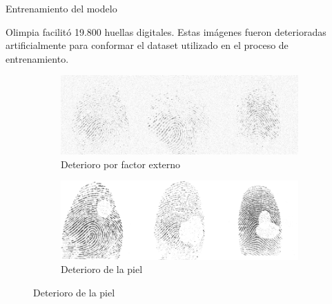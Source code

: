 \documentclass[12pt,aspectratio=169]{beamer}
\begin{document}
\begin{frame}{Entrenamiento del modelo}

    Olimpia facilitó 19.800 huellas digitales. Estas imágenes fueron deterioradas artificialmente para conformar el dataset utilizado en el proceso de entrenamiento.
    \vspace{5mm}

    \begin{figure}
        \begin{subfigure}{0.48\textwidth}
            \centering
            \includegraphics[scale=0.24]{figs/deterioration_2.png}
            \caption{Deterioro por factor externo}
        \end{subfigure}
        \begin{subfigure}{0.48\textwidth}
            \centering
            \includegraphics[scale=0.24]{figs/deterioration_1.png}
            \caption{Deterioro de la piel}
        \end{subfigure}
    \end{figure}

\end{frame}
\end{document}
